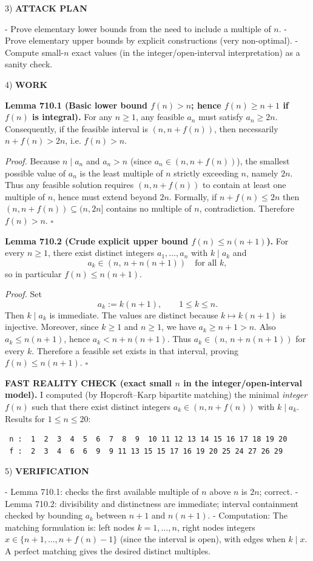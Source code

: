 3) \textbf{ATTACK PLAN}

- Prove elementary lower bounds from the need to include a multiple of $n$.
- Prove elementary upper bounds by explicit constructions (very non-optimal).
- Compute small-$n$ exact values (in the integer/open-interval interpretation) as a sanity check.

4) \textbf{WORK}

\textbf{Lemma 710.1 (Basic lower bound $f(n)>n$; hence $f(n)\ge n+1$ if $f(n)$ is integral).}
For any $n\ge 1$, any feasible $a_n$ must satisfy $a_n\ge 2n$.
Consequently, if the feasible interval is $(n,n+f(n))$, then necessarily $n+f(n)>2n$, i.e. $f(n)>n$.

\textit{Proof.}
Because $n\mid a_n$ and $a_n>n$ (since $a_n\in(n,n+f(n))$), the smallest possible value of $a_n$ is the least multiple of $n$ strictly exceeding $n$, namely $2n$.
Thus any feasible solution requires $(n,n+f(n))$ to contain at least one multiple of $n$, hence must extend beyond $2n$.
Formally, if $n+f(n)\le 2n$ then $(n,n+f(n))\subseteq(n,2n]$ contains no multiple of $n$, contradiction.
Therefore $f(n)>n$.
\hfill$\square$

\textbf{Lemma 710.2 (Crude explicit upper bound $f(n)\le n(n+1)$).}
For every $n\ge 1$, there exist distinct integers $a_1,\dots,a_n$ with $k\mid a_k$ and
\[
a_k\in (n,\,n+n(n+1))\quad\text{for all }k,
\]
so in particular $f(n)\le n(n+1)$.

\textit{Proof.}
Set
\[
 a_k := k(n+1),\qquad 1\le k\le n.
\]
Then $k\mid a_k$ is immediate.
The values are distinct because $k\mapsto k(n+1)$ is injective.
Moreover, since $k\ge 1$ and $n\ge 1$, we have $a_k\ge n+1>n$.
Also $a_k\le n(n+1)$, hence $a_k < n + n(n+1)$.
Thus $a_k\in(n,\,n+n(n+1))$ for every $k$.
Therefore a feasible set exists in that interval, proving $f(n)\le n(n+1)$.
\hfill$\square$

\textbf{FAST REALITY CHECK (exact small $n$ in the integer/open-interval model).}
I computed (by Hopcroft--Karp bipartite matching) the minimal \emph{integer} $f(n)$ such that there exist distinct integers $a_k\in(n,n+f(n))$ with $k\mid a_k$.
Results for $1\le n\le 20$:
\begin{verbatim}
 n :  1  2  3  4  5  6  7  8  9  10 11 12 13 14 15 16 17 18 19 20
 f :  2  3  4  6  6  9  9 11 13 15 15 17 16 19 20 25 24 27 26 29
\end{verbatim}

5) \textbf{VERIFICATION}

- Lemma 710.1: checks the first available multiple of $n$ above $n$ is $2n$; correct.
- Lemma 710.2: divisibility and distinctness are immediate; interval containment checked by bounding $a_k$ between $n+1$ and $n(n+1)$.
- Computation: The matching formulation is: left nodes $k=1,\dots,n$, right nodes integers $x\in\{n+1,\dots,n+f(n)-1\}$ (since the interval is open), with edges when $k\mid x$. A perfect matching gives the desired distinct multiples.

